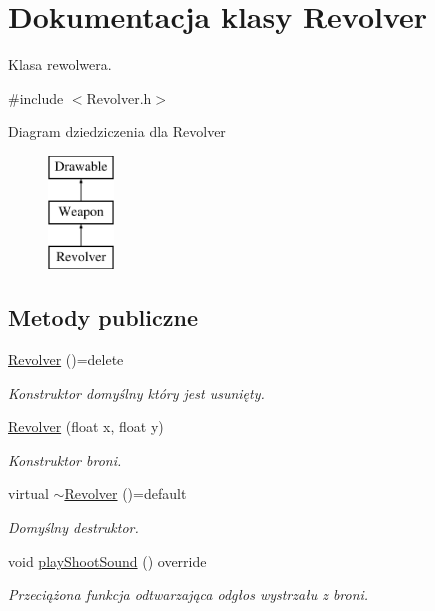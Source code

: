 \hypertarget{class_revolver}{}\section{Dokumentacja klasy Revolver}
\label{class_revolver}


Klasa rewolwera.  




{\ttfamily \#include $<$Revolver.\+h$>$}

Diagram dziedziczenia dla Revolver\begin{figure}[H]
\begin{center}
\leavevmode
\includegraphics[height=3.000000cm]{class_revolver}
\end{center}
\end{figure}
\subsection*{Metody publiczne}
\begin{DoxyCompactItemize}
\item 
\mbox{\hyperlink{class_revolver_ab4d4360bde9164e0f697a7fe3f91d8aa}{Revolver}} ()=delete
\begin{DoxyCompactList}\small\item\em Konstruktor domyślny który jest usunięty. \end{DoxyCompactList}\item 
\mbox{\hyperlink{class_revolver_a91db226199031f40f2789321108e2569}{Revolver}} (float x, float y)
\begin{DoxyCompactList}\small\item\em Konstruktor broni. \end{DoxyCompactList}\item 
virtual \mbox{\hyperlink{class_revolver_a989391a89ed1babecbc7360d670f3bc8}{$\sim$\+Revolver}} ()=default
\begin{DoxyCompactList}\small\item\em Domyślny destruktor. \end{DoxyCompactList}\item 
void \mbox{\hyperlink{class_revolver_acc5cf142969078c7ee588582cd7c9316}{play\+Shoot\+Sound}} () override
\begin{DoxyCompactList}\small\item\em Przeciążona funkcja odtwarzająca odgłos wystrzału z broni. \end{DoxyCompactList}\end{DoxyCompactItemize}
